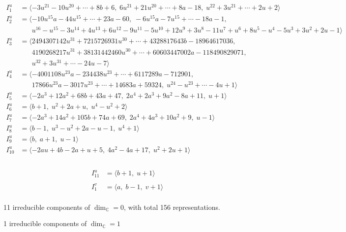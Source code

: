 \documentclass[1p]{elsarticle_modified}
\theoremstyle{definition}
\begin{document}
\begin{align*}
I^u_{1}&=\langle 
-3 u^{21}-10 u^{20}+\cdots+8 b+6,\;6 u^{21}+21 u^{20}+\cdots+8 a-18,\;u^{22}+3 u^{21}+\cdots+2 u+2\rangle \\
I^u_{2}&=\langle 
-10 u^{15} a-44 u^{15}+\cdots+23 a-60,\;-6 u^{15} a-7 u^{15}+\cdots-18 a-1,\\
\phantom{I^u_{2}}&\phantom{= \langle  }u^{16}- u^{15}-3 u^{14}+4 u^{13}+6 u^{12}-9 u^{11}-5 u^{10}+12 u^9+3 u^8-11 u^7+u^6+8 u^5- u^4-5 u^3+3 u^2+2 u-1\rangle \\
I^u_{3}&=\langle 
2494307142 u^{31}+7215726931 u^{30}+\cdots+4328817643 b-18964617036,\\
\phantom{I^u_{3}}&\phantom{= \langle  }4190268217 u^{31}+38131442460 u^{30}+\cdots+60603447002 a-118490829071,\\
\phantom{I^u_{3}}&\phantom{= \langle  }u^{32}+3 u^{31}+\cdots-24 u-7\rangle \\
I^u_{4}&=\langle 
-4001108 u^{23} a-234438 u^{23}+\cdots+6117289 a-712901,\\
\phantom{I^u_{4}}&\phantom{= \langle  }17866 u^{23} a-3017 u^{23}+\cdots+14683 a+59324,\;u^{24}- u^{23}+\cdots-4 u+1\rangle \\
I^u_{5}&=\langle 
-2 a^3+12 a^2+68 b+43 a+47,\;2 a^4+2 a^3+9 a^2-8 a+11,\;u+1\rangle \\
I^u_{6}&=\langle 
b+1,\;u^2+2 a+u,\;u^4- u^2+2\rangle \\
I^u_{7}&=\langle 
-2 a^3+14 a^2+105 b+74 a+69,\;2 a^4+4 a^3+10 a^2+9,\;u-1\rangle \\
I^u_{8}&=\langle 
b-1,\;u^3- u^2+2 a- u-1,\;u^4+1\rangle \\
I^u_{9}&=\langle 
b,\;a+1,\;u-1\rangle \\
I^u_{10}&=\langle 
-2 a u+4 b-2 a+u+5,\;4 a^2-4 a+17,\;u^2+2 u+1\rangle \\
\end{align*}\\
\begin{align*}
I^u_{11}&=\langle 
b+1,\;u+1\rangle \\
\\
I^v_{1}&=\langle 
a,\;b-1,\;v+1\rangle \\
\end{align*}
\raggedright * 11 irreducible components of $\dim_{\mathbb{C}}=0$, with total 156 representations.\\
\raggedright * 1 irreducible components of $\dim_{\mathbb{C}}=1$ \\
\end{document}
